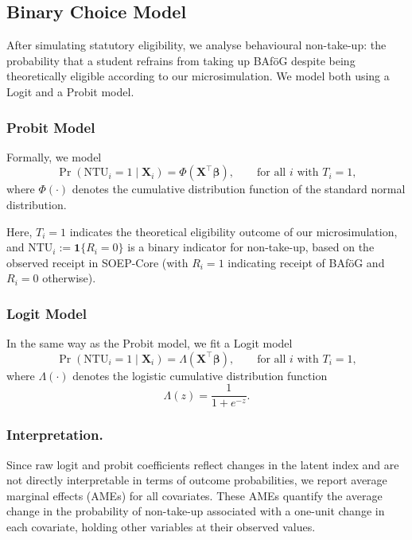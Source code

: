 \subsection{Binary Choice Model}
After simulating statutory eligibility, we analyse behavioural non-take-up: the probability that a student refrains from taking up BAföG despite being theoretically eligible according to our microsimulation. 
We model both using a Logit and a Probit model.

\subsubsection{Probit Model}
Formally, we model
\begin{equation}
  \Pr(\mathrm{NTU}_i = 1 \mid \mathbf{X}_i) = \Phi(\mathbf{X}^\top \boldsymbol{\beta})
  , \qquad \text{for all } i \text{ with } T_i = 1,
\end{equation}
where \( \Phi(\cdot) \) denotes the cumulative distribution function of the standard normal distribution. 

Here, \( T_i = 1 \) indicates the theoretical eligibility outcome of our microsimulation, and \( \mathrm{NTU}_i := \mathbf{1}\{R_i = 0\} \) is a binary indicator for non-take-up, based on the observed receipt in SOEP-Core (with \( R_i = 1 \) indicating receipt of BAföG and \( R_i = 0 \) otherwise).

\subsubsection{Logit Model}
In the same way as the Probit model, we fit a Logit model
\begin{equation}
  \Pr(\mathrm{NTU}_i = 1 \mid \mathbf{X}_i) = \Lambda(\mathbf{X}^\top \boldsymbol{\beta})
  , \qquad \text{for all } i \text{ with } T_i = 1,
\end{equation}
where \( \Lambda(\cdot) \) denotes the logistic cumulative distribution function
\begin{equation}
  \Lambda(z) = \frac{1}{1 + e^{-z}}.
\end{equation}

\subsubsection{Interpretation.} %
Since raw logit and probit coefficients reflect changes in the latent index and are not directly interpretable in terms of outcome probabilities, we report average marginal effects (AMEs) for all covariates. These AMEs quantify the average change in the probability of non-take-up associated with a one-unit change in each covariate, holding other variables at their observed values.

